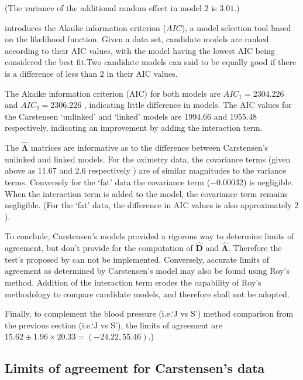 \documentclass[12pt, a4paper]{report}
\theoremstyle{plain}
\theoremstyle{definition}
\theoremstyle{remark}
\begin{document}
	\noindent (The variance of the additional random effect in model $2$ is $3.01$.)
	
	\citet{akaike} introduces the Akaike information criterion ($AIC$), a model
	selection tool based on the likelihood function. Given a data set, candidate models
	are ranked according to their AIC values, with the model having the lowest AIC being considered the best fit.Two candidate models can said to be equally good if there is a difference of less than $2$ in their AIC values.
	
	The Akaike information criterion (AIC) for both models are $AIC_{1} = 2304.226$ and $AIC_{2} = 2306.226$ , indicating little difference in models. The AIC values for the Carstensen `unlinked' and `linked' models are $1994.66$ and $1955.48$ respectively, indicating an improvement by adding the interaction term.
	
	The $\boldsymbol{\hat{\Lambda}}$ matrices are informative as to the difference between Carstensen's unlinked and linked models. For the oximetry data, the covariance terms (given above as 11.67 and 2.6 respectively ) are of similar magnitudes to the variance terms. Conversely for the `fat' data the covariance term ($-0.00032$) is negligible. When the interaction term is added to the model, the covariance term remains negligible. (For the `fat' data, the difference in AIC values is also approximately $2$).
	
	To conclude, Carstensen's models provided a rigorous way to determine limits of agreement, but don't provide for the computation of $\boldsymbol{\hat{D}}$ and $\boldsymbol{\hat{\Lambda}}$. Therefore the test's proposed by \citet{ARoy2009} can not be implemented. Conversely, accurate limits of agreement as determined by Carstensen's model may also be found using Roy's method. Addition of the interaction term erodes the capability of Roy's methodology to compare candidate models, and therefore shall not be adopted.
	
	Finally, to complement the blood pressure (i.e.`J vs S') method comparison from the previous section (i.e.`J vs S'), the limits of agreement are $15.62 \pm 1.96 \times 20.33 = (-24.22, 55.46)$.)
	\newpage
		


	


	\subsection{Limits of agreement for Carstensen's data}
	
\end{document}
